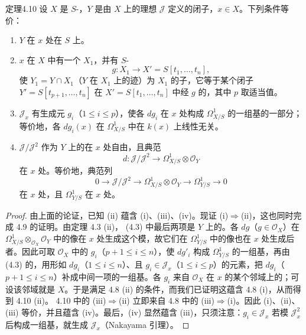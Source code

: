 \begin{SGAresult}{定理}{4.10}
设 $X$ 是 $S$-，$Y$ 是由 $X$ 上的理想 $\mathcal J$ 定义的闭子，$x\in X$。下列条件等价：
\begin{enumerate}
\item[(i)] $Y$ 在 $x$ 处在 $S$ 上。
\item[(ii)] $x$ 在 $X$ 中有一个 $X_1$，并有 $S$-
\[
g:X_1\longrightarrow X'=S[t_1,\ldots,t_n],
\]
使 $Y_1=Y\cap X_1$（$Y$ 在 $X_1$ 上的迹）为 $X_1$ 的子，它等于某个闭子 $Y'=S[t_{p+1},\ldots,t_n]$ 在 $X'=S[t_1,\ldots,t_n]$ 中经 $g$ 的，其中 $p$ 取适当值。
\item[(iii)] $\mathcal J_x$ 有生成元 $g_i$（$1\leq i\leq p$），使各 $dg_i$ 在 $x$ 处构成 $\Omega^1_{X/S}$ 的一组基的一部分；等价地，各 $dg_i(x)$ 在 $\Omega^1_{X/S}$ 中在 $k(x)$ 上线性无关。
\item[(iv)] $\mathcal J/\mathcal J^2$ 作为 $Y$ 上的在 $x$ 处自由，且典范
\[
d:\mathcal J/\mathcal J^2\longrightarrow\Omega^1_{X/S}\otimes\mathcal O_Y
\]
在 $x$ 处。等价地，典范列
\[
0\longrightarrow\mathcal J/\mathcal J^2
\longrightarrow\Omega^1_{X/S}\otimes\mathcal O_Y
\longrightarrow\Omega^1_{Y/S}\longrightarrow0
\]
在 $x$ 处，且 $\Omega^1_{Y/S}$ 在 $x$ 处。
\end{enumerate}
\end{SGAresult}
\begin{proof}
由上面的论证，已知 (ii) 蕴含 (i)、(iii)、(iv)。现证 (i)$\Rightarrow$(ii)，这也同时完成 4.9 的证明。由定理 4.3 (ii)， (4.3) 中最后两项是 $Y$ 上的。各 $dg$（$g\in\mathcal O_X$）在 $\Omega^1_{X/S}\otimes_{\mathcal O_X}\mathcal O_Y$ 中的像在 $x$ 处生成这个模，故它们在 $\Omega^1_{Y/S}$ 中的像也在 $x$ 处生成后者。因此可取 $\mathcal O_X$ 中的 $g_i$（$p+1\leq i\leq n$），使 $dg'_i$ 构成 $\Omega^1_{Y/S}$ 的一组基，再由 (4.3) 的，用形如 $dg_i$（$1\leq i\leq n$）、且 $g_i\in\mathcal J_x$（$1\leq i\leq p$）的元素，把 $dg_i$（$p+1\leq i\leq n$）补成中间一项的一组基。各 $g_i$ 来自 $\mathcal O_X$ 在 $x$ 的某个邻域上的；可设该邻域就是 $X$。于是满足 4.8 (ii) 的条件，而我们已证明这蕴含 4.8 (i)，从而得到 4.10 (ii)。
4.10 中的 (iii)$\Rightarrow$(ii) 立即来自 4.8 中的 (iii)$\Rightarrow$(i)。因此 (i)、(ii)、(iii) 等价，并且蕴含 (iv)。最后，(iv) 显然蕴含 (iii)，只须注意：$g_i\in\mathcal J_x$ 若模 $\mathcal J_x^2$ 后构成一组基，就生成 $\mathcal J_x$（Nakayama 引理）。
\end{proof}

